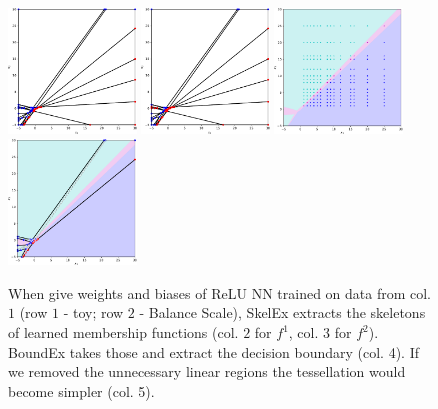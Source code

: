 \documentclass{article}
\begin{document}
\begin{figure}
    \includegraphics[width=3.4cm]{Figures/membership2_1.pdf}
    \includegraphics[width=3.4cm]{Figures/membership2_2.pdf}
    \includegraphics[width=3.4cm]{Figures/decision_boundary2_1.pdf}
    \includegraphics[width=3.4cm]{Figures/decision_boundary2_2}
    \caption{When give weights and biases of ReLU NN trained on data from col. $1$ (row $1$ - toy; row $2$ - Balance Scale), SkelEx extracts the skeletons of learned membership functions (col. $2$ for $f^1$, col. $3$ for $f^2$). BoundEx takes those and extract the decision boundary (col. 4). If we removed the unnecessary linear regions the tessellation would become simpler (col. 5).}
    \vspace{-3mm}
    \label{fig:BoundEx_examples}
\end{figure}
\end{document}
